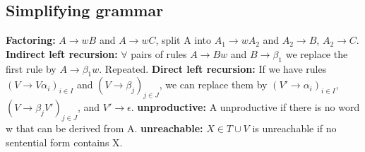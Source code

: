 \subsection*{Simplifying grammar}
\textbf{Factoring:} $A \rightarrow wB$ and $A \rightarrow wC$, split A into $A_1 \rightarrow wA_2$ and $A_2 \rightarrow B$, $A_2 \rightarrow C$. \textbf{Indirect left recursion:} $\forall$ pairs of rules $A \rightarrow Bw$ and $B \rightarrow \beta_1$ we replace the first rule by $A \rightarrow \beta_1 w$. Repeated. \textbf{Direct left recursion:} If we have rules $(V \rightarrow V \alpha_i)_{i\in I}$ and $(V \rightarrow \beta_j)_{j\in J}$, we can replace them by $(V' \rightarrow \alpha_i )_{i\in I}$, $(V \rightarrow \beta_j V')_{j\in J}$, and $V' \rightarrow \epsilon$. \textbf{unproductive:} A unproductive if there is no word w that can be derived from A. \textbf{unreachable:} $X \in T \cup V$ is unreachable if no sentential form contains X.
